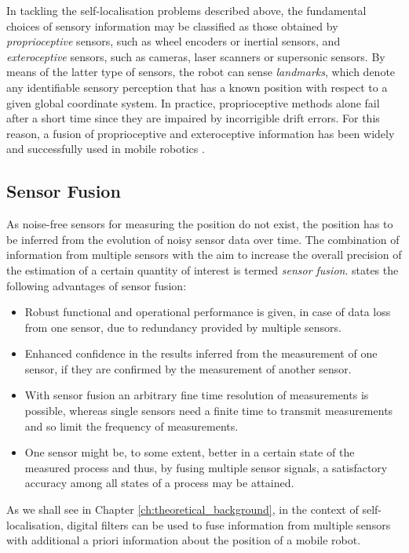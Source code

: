  In tackling the self-localisation problems described above, the fundamental choices of sensory information may be classified as those obtained by \emph{proprioceptive} sensors, such as wheel encoders or inertial sensors, and \emph{exteroceptive} sensors, such as cameras, laser scanners or supersonic sensors. By means of the latter type of sensors, the robot can sense \emph{landmarks}, which denote any identifiable sensory perception that has a known position with respect to a given global coordinate system. In practice, proprioceptive methods alone fail after a short time since they are impaired by incorrigible drift errors. For this reason, a fusion of proprioceptive and exteroceptive information has been widely and successfully used in mobile robotics \cite{nehmzow2001mobile}.

\subsection{Sensor Fusion}

As noise-free sensors for measuring the position do not exist, the position has to be inferred from the evolution of noisy sensor data over time. The combination of information from multiple sensors with the aim to increase the overall precision of the estimation of a certain quantity of interest is termed \emph{sensor fusion}. \citeauthor{raol2009multi} \cite{raol2009multi} states the following advantages of sensor fusion:
 
\begin{itemize}
\item Robust functional and operational performance is given, in case of data loss from one sensor, due to redundancy provided by multiple sensors.
\item Enhanced confidence in the results inferred from the measurement of one sensor, if they are confirmed by the measurement of another sensor.
\item With sensor fusion an arbitrary fine time resolution of measurements is possible, whereas single sensors need a finite time to transmit measurements and so limit the frequency of measurements.
\item One sensor might be, to some extent, better in a certain state of the measured process and thus, by fusing multiple sensor signals, a satisfactory accuracy among all states of a process may be attained.
\end{itemize}

\noindent
As we shall see in Chapter \ref{ch:theoretical_background}, in the context of self-localisation, digital filters can be used to fuse information from multiple sensors with additional a priori information about the position of a mobile robot.


